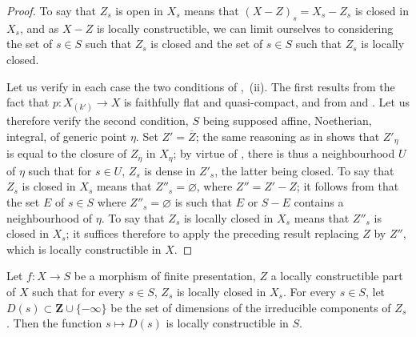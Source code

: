 \begin{proof}
To say that $Z_s$ is open in $X_s$ means that $(X-Z)_s=X_s-Z_s$ is closed in $X_s$, and as $X-Z$ is locally constructible, we can limit ourselves to considering the set of $s\in S$ such that $Z_s$ is closed and the set of $s\in S$ such that $Z_s$ is locally closed.

Let us verify in each case the two conditions of ,~(ii).
The first results from the fact that $p:X_{(k')}\to X$ is faithfully flat and quasi-compact, and from  and .
Let us therefore verify the second condition, $S$ being supposed affine, Noetherian, integral, of generic point $\eta$.
Set $Z'=\overline{Z}$; the same reasoning as in  shows that $Z'_\eta$ is equal to the closure of $Z_\eta$ in $X_\eta$; by virtue of , there is thus a neighbourhood $U$ of $\eta$ such that for $s\in U$, $Z_s$ is dense in $Z'_s$, the latter being closed.
To say that $Z_s$ is closed in $X_s$ means that $Z''_s=\varnothing$, where $Z''=Z'-Z$; it follows from  that the set $E$ of $s\in S$ where $Z''_s=\varnothing$ is such that $E$ or $S-E$ contains a neighbourhood of $\eta$.
To say that $Z_s$ is locally closed in $X_s$ means that $Z''_s$ is closed in $X_s$; it suffices therefore to apply the preceding result replacing $Z$ by $Z''$, which is locally constructible in $X$.
\end{proof}

\begin{proposition}[9.5.5]
\label{IV.9.5.5}
Let $f:X\to S$ be a morphism of finite presentation, $Z$ a locally constructible part of $X$ such that for every $s\in S$, $Z_s$ is locally closed in $X_s$.
For every $s\in S$, let $D(s)\subset\mathbf{Z}\cup\{-\infty\}$ be the set of dimensions of the irreducible components of $Z_s$.
Then the function $s\mapsto D(s)$ is locally constructible in $S$.
\end{proposition}

